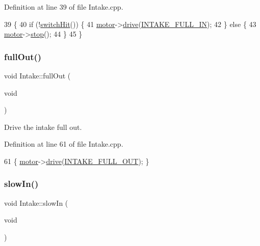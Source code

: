 Definition at line 39 of file Intake.\+cpp.


\begin{DoxyCode}
39                         \{
40     \textcolor{keywordflow}{if} (!\hyperlink{class_intake_ae9bf8ae8ebed0f1ba36443373eb0ae63}{switchHit}()) \{
41         \hyperlink{class_intake_abfffad571bacf945d6a2a121f59869fd}{motor}->\hyperlink{class_v_e_x_motor_ac8ab5c30e4be4a9e3ed290e7827bcf1a}{drive}(\hyperlink{_intake_8hpp_a1deaa236a445e37471a0ba4490e1f9ed}{INTAKE\_FULL\_IN});
42     \} \textcolor{keywordflow}{else} \{
43         \hyperlink{class_intake_abfffad571bacf945d6a2a121f59869fd}{motor}->\hyperlink{class_v_e_x_motor_aed9dadedda6a075093f076921958e7ed}{stop}();
44     \}
45 \}
\end{DoxyCode}
\mbox{\label{class_intake_abd14de5ccd68929ea2627ca11aec9688}} 
\subsubsection{\texorpdfstring{full\+Out()}{fullOut()}}
{\footnotesize\ttfamily void Intake\+::full\+Out (\begin{DoxyParamCaption}\item[{void}]{ }\end{DoxyParamCaption})}



Drive the intake full out. 



Definition at line 61 of file Intake.\+cpp.


\begin{DoxyCode}
61 \{ \hyperlink{class_intake_abfffad571bacf945d6a2a121f59869fd}{motor}->\hyperlink{class_v_e_x_motor_ac8ab5c30e4be4a9e3ed290e7827bcf1a}{drive}(\hyperlink{_intake_8hpp_a9b5084e3c227f32c6ecefa2ca8d7fd84}{INTAKE\_FULL\_OUT}); \}
\end{DoxyCode}
\mbox{\label{class_intake_a4c1e0e346839bb294065ae5da7117df0}} 
\subsubsection{\texorpdfstring{slow\+In()}{slowIn()}}
{\footnotesize\ttfamily void Intake\+::slow\+In (\begin{DoxyParamCaption}\item[{void}]{ }\end{DoxyParamCaption})}



